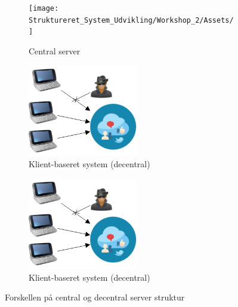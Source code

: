 \begin{figure}[H]
    \begin{subfigure}{0.33\textwidth}
        \centering
        \texttt{[image: Struktureret\_System\_Udvikling/Workshop\_2/Assets/]} 
        \caption{Central server}
        \label{fig:central_server}
    \end{subfigure}
    \begin{subfigure}{0.33\textwidth}
        \centering
        \includegraphics[width=0.7\linewidth, height=4cm]{Projectdoc/Assets/Illustrationer/Security_diagram_2.png}
        \caption{Klient-baseret system (decentral)}
        \label{fig:decentral_server}
    \end{subfigure}
    \begin{subfigure}{0.33\textwidth}
        \centering
        \includegraphics[width=0.7\linewidth, height=4cm]{Projectdoc/Assets/Illustrationer/Security_diagram_2.png}
        \caption{Klient-baseret system (decentral)}
        \label{fig:decentral_server}
    \end{subfigure}
    \caption{Forskellen på central og decentral server struktur}
    \label{fig:serverstruktur}
\end{figure}

